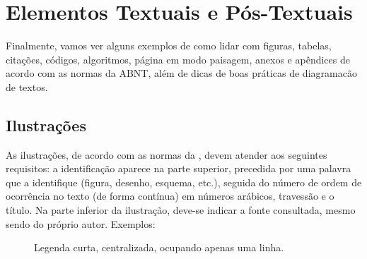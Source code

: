 \chapter{Elementos Textuais e Pós-Textuais}

Finalmente, vamos ver alguns exemplos de como lidar com figuras, tabelas, citações, códigos, algoritmos, página em modo paisagem, anexos e apêndices de acordo com as normas da ABNT, além de dicas de boas práticas de diagramacão de textos.

\section{Ilustrações}

As ilustrações, de acordo com as normas da , devem atender aos seguintes requisitos: a identificação aparece na parte superior, precedida por uma palavra que a identifique (figura, desenho, esquema, etc.), seguida do número de ordem de ocorrência no texto (de forma contínua) em números arábicos, travessão e o título. Na parte inferior da ilustração, deve-se indicar a fonte consultada, mesmo sendo do próprio autor. Exemplos:

\newcommand{\proton}[1]{%
    \shade[ball color=red] (#1) circle (.25);\draw (#1) node{$+$};
}

\newcommand{\neutron}[1]{%
    \shade[ball color=green] (#1) circle (.25);
}

\newcommand{\electron}[3]{%
    \draw[rotate = #3](0,0) ellipse (#1 and #2)[color=blue];
    \shade[ball color=black] (0,#2)[rotate=#3] circle (.1);
}

\newcommand{\nucleus}{%
    \neutron{0.1,0.3}
    \proton{0,0}
    \neutron{0.3,0.2}
    \proton{-0.2,0.1}
    \neutron{-0.1,0.3}
    \proton{0.2,-0.15}
    \neutron{-0.05,-0.12}
    \proton{0.17,0.21}
}

\vspace*{10pt}
\begin{figure}[!h]
    \centering
    \caption{Legenda curta, centralizada, ocupando apenas uma linha.}
    \vspace{5pt}    
    \vspace{5pt}    
\end{figure}


